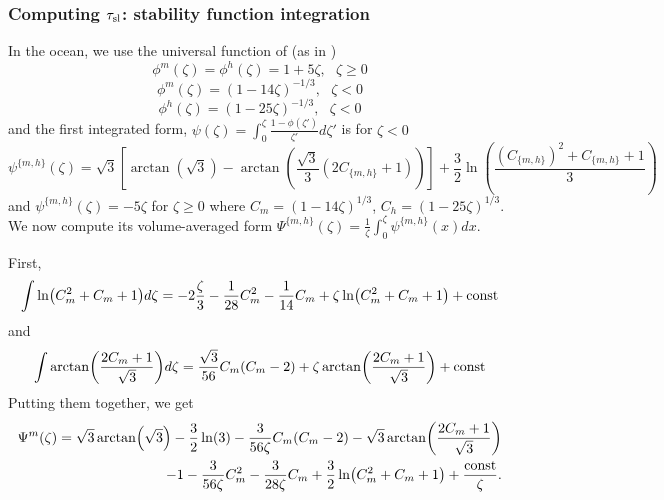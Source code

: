 \subsubsection{Computing $\tau_{\rm sl}$: stability function integration}
\label{sec:ND_Ocean_stabilityFunctionIntegration}
In the ocean, we use the universal function of \citep{large_similarity_2019} (as in \citep{pelletier_two-sided_2021})
\begin{equation}
	\phi^m(\zeta) = \phi^h(\zeta) = 1+5\zeta, ~~~ \zeta \geq 0
\end{equation}
\begin{equation}
	\phi^m(\zeta) = (1-14\zeta)^{-1/3}, ~~~ \zeta < 0
\end{equation}
\begin{equation}
	\phi^h(\zeta) = (1-25\zeta)^{-1/3}, ~~~ \zeta < 0
\end{equation}
and the first integrated form, $\psi(\zeta)= \int_0^\zeta \frac{1-\phi(\zeta')}{\zeta'}d\zeta'$ is for $\zeta<0$
\begin{equation}
	\psi^{\{m,h\}}(\zeta)  = \sqrt{3}\left[\arctan(\sqrt{3}) -
	\arctan\left(\frac{\sqrt{3}}{3}(2C_{\{m,h\}}+1)\right)\right]
	+ \frac{3}{2}\ln \left(\frac{(C_{\{m,h\}})^2 + C_{\{m,h\}} + 1}{3}\right)
\end{equation}
and $\psi^{\{m,h\}}(\zeta) = -5\zeta$ for $\zeta \geq 0$
where $C_m = (1-14\zeta)^{1/3}$, $C_h = (1-25\zeta)^{1/3}$.
We now compute its volume-averaged form $\Psi^{\{m,h\}}(\zeta)= \frac{1}{\zeta}\int_0^\zeta \psi^{\{m,h\}}(x)dx$.
\par
First,
\begin{equation}
	\int \ln (C_m^2+C_m+1)d\zeta
	= -2 \frac{\zeta}{3} - \frac{1}{28}C_m^2 - \frac{1}{14}C_m
	+\zeta\ln (C_m^2+C_m+1) + {\rm const}
\end{equation}
and
\begin{equation}
	\int \arctan (\frac{2C_m+1}{\sqrt{3}})d\zeta
	= \frac{\sqrt{3}}{56}C_m(C_m-2)
	+ \zeta \arctan (\frac{2C_m+1}{\sqrt{3}}) + {\rm const}
\end{equation}
Putting them together, we get
\begin{equation}
\begin{aligned}
	\Psi^m(\zeta)=\sqrt{3}\arctan(\sqrt{3})- 
	\frac{3}{2}\ln(3) -
	\frac{3}{56\zeta}C_m(C_m-2)
	- \sqrt{3} \arctan (\frac{2C_m+1}{\sqrt{3}})
	\\
	-1 - \frac{3}{56\zeta}C_m^2 - \frac{3}{28\zeta}C_m
	+\frac{3}{2}\ln (C_m^2+C_m+1)
	+ \frac{{\rm const}}{\zeta}.
\end{aligned}
\end{equation}
